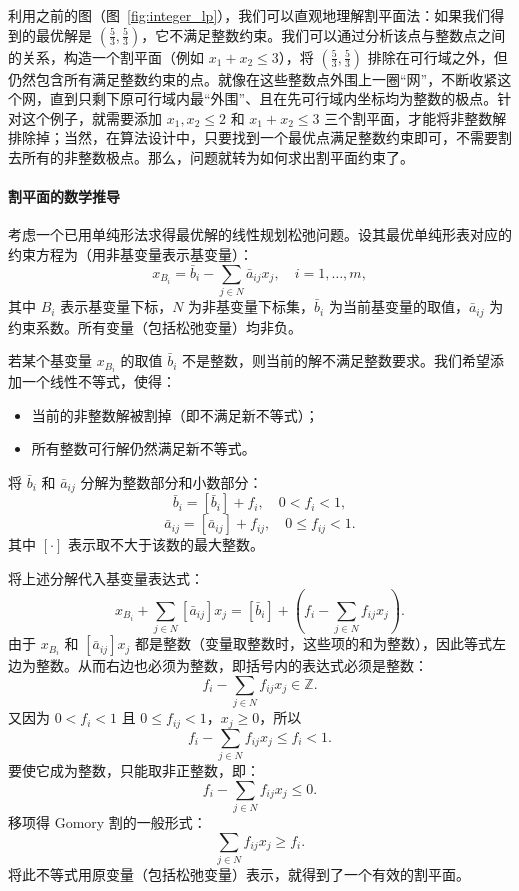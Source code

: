 \documentclass[12pt]{article}
\theoremstyle{plain}
\theoremstyle{definition}
\begin{document}
利用之前的图（图~\ref{fig:integer_lp}），我们可以直观地理解割平面法：如果我们得到的最优解是 $(\frac{5}{3}, \frac{5}{3})$，它不满足整数约束。我们可以通过分析该点与整数点之间的关系，构造一个割平面（例如 $x_1 + x_2 \leq 3$），将 $(\frac{5}{3}, \frac{5}{3})$ 排除在可行域之外，但仍然包含所有满足整数约束的点。就像在这些整数点外围上一圈“网”，不断收紧这个网，直到只剩下原可行域内最“外围”、且在先可行域内坐标均为整数的极点。针对这个例子，就需要添加 $x_1, x_2 \leq 2$ 和 $x_1 + x_2 \leq 3$ 三个割平面，才能将非整数解排除掉；当然，在算法设计中，只要找到一个最优点满足整数约束即可，不需要割去所有的非整数极点。那么，问题就转为如何求出割平面约束了。

\paragraph{割平面的数学推导}
考虑一个已用单纯形法求得最优解的线性规划松弛问题。设其最优单纯形表对应的约束方程为（用非基变量表示基变量）：
\[ x_{B_i} = \bar{b}_i - \sum_{j \in N} \bar{a}_{ij} x_j, \quad i = 1,\dots,m, \]
其中 $B_i$ 表示基变量下标，$N$ 为非基变量下标集，$\bar{b}_i$ 为当前基变量的取值，$\bar{a}_{ij}$ 为约束系数。所有变量（包括松弛变量）均非负。

若某个基变量 $x_{B_i}$ 的取值 $\bar{b}_i$ 不是整数，则当前的解不满足整数要求。我们希望添加一个线性不等式，使得：
\begin{itemize}
    \item 当前的非整数解被割掉（即不满足新不等式）；
    \item 所有整数可行解仍然满足新不等式。
\end{itemize}

将 $\bar{b}_i$ 和 $\bar{a}_{ij}$ 分解为整数部分和小数部分：
\[ \bar{b}_i = [\bar{b}_i] + f_i, \quad 0 < f_i < 1, \]
\[ \bar{a}_{ij} = [\bar{a}_{ij}] + f_{ij}, \quad 0 \le f_{ij} < 1. \]
其中 $[\cdot]$ 表示取不大于该数的最大整数。

将上述分解代入基变量表达式：
\[
x_{B_i} + \sum_{j \in N} [\bar{a}_{ij}] x_j = [\bar{b}_i] + \left( f_i - \sum_{j \in N} f_{ij} x_j \right).
\]
由于 $x_{B_i}$ 和 $[\bar{a}_{ij}] x_j$ 都是整数（变量取整数时，这些项的和为整数），因此等式左边为整数。从而右边也必须为整数，即括号内的表达式必须是整数：
\[ f_i - \sum_{j \in N} f_{ij} x_j \in \mathbb{Z}. \]
又因为 $0 < f_i < 1$ 且 $0 \le f_{ij} < 1$，$x_j \ge 0$，所以
\[ f_i - \sum_{j \in N} f_{ij} x_j \le f_i < 1. \]
要使它成为整数，只能取非正整数，即：
\[ f_i - \sum_{j \in N} f_{ij} x_j \le 0. \]
移项得 Gomory 割的一般形式：
\begin{equation} \label{eq:gomory_cut}
    \sum_{j \in N} f_{ij} x_j \ge f_i.
\end{equation}
将此不等式用原变量（包括松弛变量）表示，就得到了一个有效的割平面。
\end{document}

